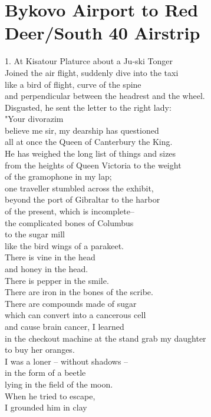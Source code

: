 \documentclass[smalldemyvopaper,11pt,twoside,onecolumn,openright,extrafontsizes]{memoir}
\begin{document}
\chapter{Bykovo Airport to Red Deer/South 40 Airstrip}
1. At Kisatour Platurce about a Ju-ski Tonger
\\Joined the air flight, suddenly dive into the taxi
\\like a bird of flight, curve of the spine
\\and perpendicular between the headrest and the wheel.
\\Disgusted, he sent the letter to the right lady:
\\"Your divorazim
\\believe me sir, my dearship has questioned
\\all at once the Queen of Canterbury the King.
\\He has weighed the long list of things and sizes
\\from the heights of Queen Victoria to the weight
\\of the gramophone in my lap;
\\one traveller stumbled across the exhibit,
\\beyond the port of Gibraltar to the harbor
\\of the present, which is incomplete--
\\the complicated bones of Columbus
\\to the sugar mill
\\like the bird wings of a parakeet.
\\There is vine in the head
\\and honey in the head.
\\There is pepper in the smile.
\\There are iron in the bones of the scribe.
\\There are compounds made of sugar
\\which can convert into a cancerous cell
\\and cause brain cancer, I learned
\\in the checkout machine at the stand grab my daughter
\\to buy her oranges.
\\I was a loner -- without shadows --
\\in the form of a beetle
\\lying in the field of the moon.
\\When he tried to escape,
\\I grounded him in clay
\end{document}
